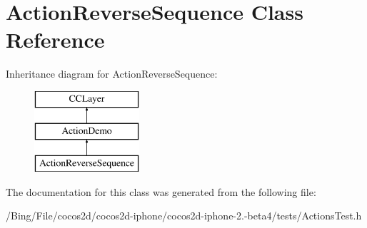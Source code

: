 \hypertarget{interface_action_reverse_sequence}{\section{Action\-Reverse\-Sequence Class Reference}
\label{interface_action_reverse_sequence}
}
Inheritance diagram for Action\-Reverse\-Sequence\-:\begin{figure}[H]
\begin{center}
\leavevmode
\includegraphics[height=3.000000cm]{interface_action_reverse_sequence}
\end{center}
\end{figure}


The documentation for this class was generated from the following file\-:\begin{DoxyCompactItemize}
\item 
/\-Bing/\-File/cocos2d/cocos2d-\/iphone/cocos2d-\/iphone-\/2.-\/beta4/tests/Actions\-Test.\-h\end{DoxyCompactItemize}
